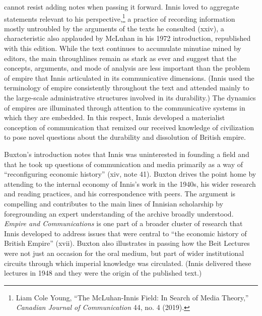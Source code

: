 \documentclass{tufte-handout}
\begin{document}
\noindent cannot resist adding notes when passing it
forward. Innis loved to aggregate statements relevant to his
perspective,\footnote{Liam Cole Young, ``The McLuhan-Innis Field: In
  Search of Media Theory,'' \emph{Canadian Journal of Communication} 44,
  no. 4 (2019).} a practice of recording information mostly untroubled
by the arguments of the texts he consulted (xxiv), a characteristic also
applauded by McLuhan in his 1972 introduction, republished with this
edition. While the text continues to accumulate minutiae mined by
editors, the main throughlines remain as stark as ever and suggest that
the concepts, arguments, and mode of analysis are less important than
the problem of empire that Innis articulated in its communicative
dimensions. (Innis used the terminology of empire consistently
throughout the text and attended mainly to the large-scale
administrative structures involved in its durability.) The dynamics of
empires are illuminated through attention to the communicative systems
in which they are embedded. In this respect, Innis developed a
materialist conception of communication that remixed our received
knowledge of civilization to pose novel questions about the durability
and dissolution of British empire.

Buxton's introduction notes that Innis was uninterested in founding a
field and that he took up questions of communication and media primarily
as a way of ``reconfiguring economic history'' (xiv, note 41). Buxton
drives the point home by attending to the internal economy of Innis's
work in the 1940s, his wider research and reading practices, and his
correspondence with peers. The argument is compelling and contributes to
the main lines of Innisian scholarship by foregrounding an expert
understanding of the archive broadly understood. \emph{Empire and
Communications} is one part of a broader cluster of research that Innis
developed to address issues that were central to ``the economic history
of British Empire'' (xvii). Buxton also illustrates in passing how the
Beit Lectures were not just an occasion for the oral medium, but part of
wider institutional circuits through which imperial knowledge was
circulated. (Innis delivered these lectures in 1948 and they were the
origin of the published text.)
\end{document}
